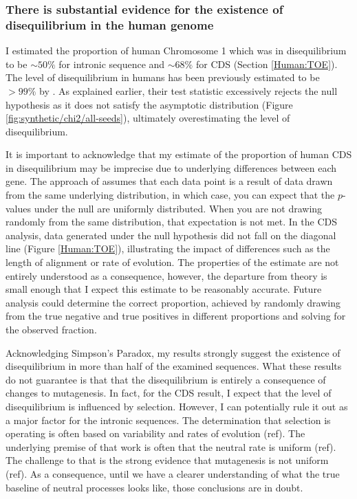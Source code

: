 \subsubsection{There is substantial evidence for the existence of disequilibrium in the human genome}

I estimated the proportion of human Chromosome 1 which was in disequilibrium to be $\sim50\%$ for intronic sequence and $\sim68\%$ for CDS (Section \ref{Human:TOE}). The level of disequilibrium in humans has been previously estimated to be $>99\%$ by \cite{Squartini2008QuantifyingProcess}. As explained earlier, their test statistic excessively rejects the null hypothesis as it does not satisfy the asymptotic distribution (Figure \ref{fig:synthetic/chi2/all-seeds}), ultimately overestimating the level of disequilibrium. 

It is important to acknowledge that my estimate of the proportion of human CDS in disequilibrium may be imprecise due to underlying differences between each gene. The approach of \cite{Storey2003StatisticalStudies} assumes that each data point is a result of data drawn from the same underlying distribution, in which case, you can expect that the $p$-values under the null are uniformly distributed. When you are not drawing randomly from the same distribution, that expectation is not met. In the CDS analysis, data generated under the null hypothesis did not fall on the diagonal line (Figure \ref{Human:TOE}), illustrating the impact of differences such as the length of alignment or rate of evolution. The properties of the estimate are not entirely understood as a consequence, however, the departure from theory is small enough that I expect this estimate to be reasonably accurate. Future analysis could determine the correct proportion, achieved by randomly drawing from the true negative and true positives in different proportions and solving for the observed fraction. 

Acknowledging Simpson's Paradox, my results strongly suggest the existence of disequilibrium in more than half of the examined sequences. What these results do not guarantee is that that the disequilibrium is entirely a consequence of changes to mutagenesis. In fact, for the CDS result, I expect that the level of disequilibrium is influenced by selection. However, I can potentially rule it out as a major factor for the intronic sequences. The determination that selection is operating is often based on variability and rates of evolution (ref). The underlying premise of that work is often that the neutral rate is uniform (ref). The challenge to that is the strong evidence that mutagenesis is not uniform (ref). As a consequence, until we have a clearer understanding of what the true baseline of neutral processes looks like, those conclusions are in doubt. 

